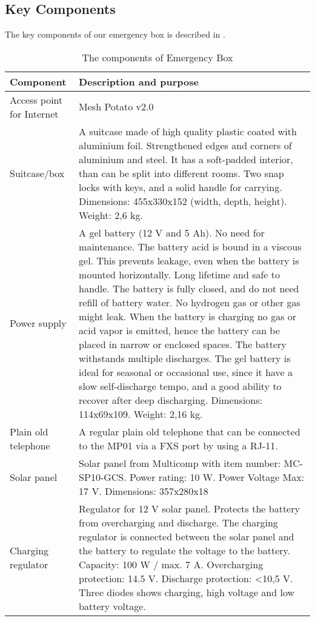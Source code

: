 \subsection{Key Components}
The key components of our emergency box is described in . 

\begin{center}
\begin{table}[h!]
\caption{\label{tab:components}The components of Emergency Box}
    \begin{tabular}{ | l | p{9cm} |}
    \hline
    \textbf{Component} & \textbf{Description and purpose} \\ 
    \hline
    Access point for Internet &  Mesh Potato v2.0\\ 
    \hline
    Suitcase/box &  A suitcase made of high quality plastic coated with aluminium foil. Strengthened edges and corners of aluminium and steel. It has a soft-padded interior, than can be split into different rooms. Two snap locks with keys, and a solid handle for carrying. Dimensions: 455x330x152 (width, depth, height). Weight: 2,6 kg. \\ 
    \hline
    Power supply & A gel battery (12 V and 5 Ah). No need for maintenance. The battery acid is bound in a viscous gel. This prevents leakage, even when the battery is mounted horizontally. Long lifetime and safe to handle. The battery is fully closed, and do not need refill of battery water. No hydrogen gas or other gas might leak. When the battery is charging no gas or acid vapor is emitted, hence the battery can be placed in narrow or enclosed spaces. The battery withstands multiple discharges. The gel battery is ideal for seasonal or occasional use, since it have a slow self-discharge tempo, and a good ability to recover after deep discharging. Dimensions: 114x69x109. Weight: 2,16 kg. \\
    \hline
    Plain old telephone &  A regular plain old telephone that can be connected to the MP01 via a FXS port by using a RJ-11. \\
	\hline
	Solar panel & Solar panel from Multicomp with item number: MC-SP10-GCS. Power rating: 10 W. Power Voltage Max: 17 V. Dimensions: 357x280x18\\
	\hline
	Charging regulator & Regulator for 12 V solar panel. Protects the battery from overcharging and discharge. The charging regulator is connected between the solar panel and the battery to regulate the voltage to the battery. Capacity: 100 W / max. 7 A. Overcharging protection: 14.5 V. Discharge protection: <10,5 V. Three diodes shows charging, high voltage and low battery voltage. \\
	\hline
    \end{tabular}
   \end{table}
\end{center}

